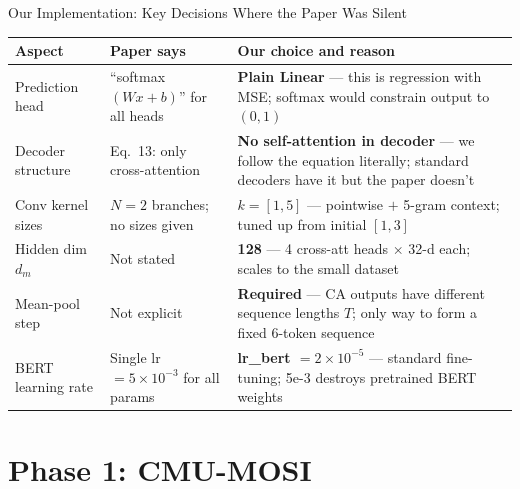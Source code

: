 \documentclass[aspectratio=169,10pt]{beamer}
\begin{document}
\begin{frame}{Our Implementation: Key Decisions Where the Paper Was Silent}
  \centering\small
  \begin{tabular}{p{2.7cm}p{3.2cm}p{5.2cm}}
    \toprule
    \textbf{Aspect} & \textbf{Paper says} & \textbf{Our choice and reason} \\
    \midrule
    Prediction head & ``softmax$(Wx{+}b)$'' for all heads & \textbf{Plain Linear} --- this is regression with MSE; softmax would constrain output to $(0,1)$ \\[3pt]
    Decoder structure & Eq.\ 13: only cross-attention & \textbf{No self-attention in decoder} --- we follow the equation literally; standard decoders have it but the paper doesn't \\[3pt]
    Conv kernel sizes & $N{=}2$ branches; no sizes given & \textbf{$k=[1,5]$} --- pointwise $+$ 5-gram context; tuned up from initial $[1,3]$ \\[3pt]
    Hidden dim $d_m$ & Not stated & \textbf{128} --- 4 cross-att heads $\times$ 32-d each; scales to the small dataset \\[3pt]
    Mean-pool step & Not explicit & \textbf{Required} --- CA outputs have different sequence lengths $T$; only way to form a fixed 6-token sequence \\[3pt]
    BERT learning rate & Single lr $= 5{\times}10^{-3}$ for all params & \textbf{lr\_bert $= 2{\times}10^{-5}$} --- standard fine-tuning; 5e-3 destroys pretrained BERT weights \\
    \bottomrule
  \end{tabular}
\end{frame}

\section{Phase 1: CMU-MOSI}
\end{document}

